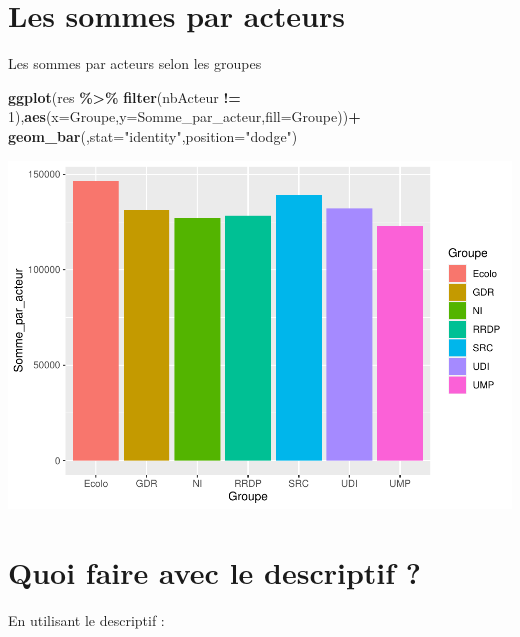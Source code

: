 \documentclass[
]{book}
\newenvironment{Shaded}{\begin{snugshade}}{\end{snugshade}}
\newcommand{\AttributeTok}[1]{\textcolor[rgb]{0.13,0.29,0.53}{#1}}
\newcommand{\DecValTok}[1]{\textcolor[rgb]{0.00,0.00,0.81}{#1}}
\newcommand{\FunctionTok}[1]{\textcolor[rgb]{0.13,0.29,0.53}{\textbf{#1}}}
\newcommand{\NormalTok}[1]{#1}
\newcommand{\SpecialCharTok}[1]{\textcolor[rgb]{0.81,0.36,0.00}{\textbf{#1}}}
\newcommand{\StringTok}[1]{\textcolor[rgb]{0.31,0.60,0.02}{#1}}
\begin{document}
\hypertarget{les-sommes-par-acteurs}{%
\section{Les sommes par acteurs}\label{les-sommes-par-acteurs}}

Les sommes par acteurs selon les groupes

\begin{Shaded}
\begin{Highlighting}[]
\FunctionTok{ggplot}\NormalTok{(res }\SpecialCharTok{\%\textgreater{}\%} \FunctionTok{filter}\NormalTok{(nbActeur }\SpecialCharTok{!=} \DecValTok{1}\NormalTok{),}\FunctionTok{aes}\NormalTok{(}\AttributeTok{x=}\NormalTok{Groupe,}\AttributeTok{y=}\NormalTok{Somme\_par\_acteur,}\AttributeTok{fill=}\NormalTok{Groupe))}\SpecialCharTok{+}
  \FunctionTok{geom\_bar}\NormalTok{(,}\AttributeTok{stat=}\StringTok{"identity"}\NormalTok{,}\AttributeTok{position=}\StringTok{"dodge"}\NormalTok{)}
\end{Highlighting}
\end{Shaded}

\includegraphics{_main_files/figure-latex/reserve6-1.pdf}

\hypertarget{quoi-faire-avec-le-descriptif}{%
\section{Quoi faire avec le descriptif ?}\label{quoi-faire-avec-le-descriptif}}

En utilisant le descriptif :
\end{document}
